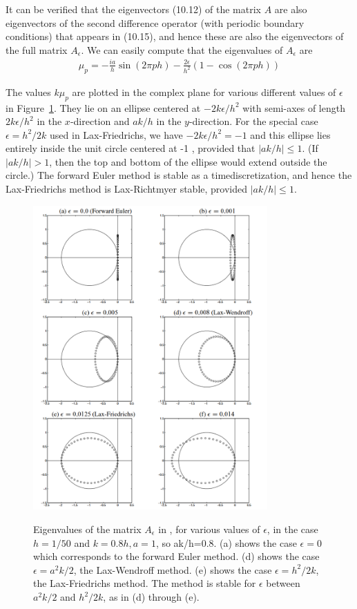 It can be verified that the eigenvectors (10.12) of the matrix $A$ are also eigenvectors of the second difference operator (with periodic boundary conditions) that appears in (10.15), and hence these are also the eigenvectors of the full matrix $A_\epsilon$. We can easily compute that the eigenvalues of $A_\epsilon$ are
\begin{align}
    \label{eq: eig of Aeps LF advect}
\mu_p=-\frac{i a}{h} \sin (2 \pi p h)-\frac{2 \epsilon}{h^2}(1-\cos (2 \pi p h))
\end{align}

The values $k \mu_p$ are plotted in the complex plane for various different values of $\epsilon$ in Figure~\ref{fig 10.1}. They lie on an ellipse centered at $-2 k \epsilon / h^2$ with semi-axes of length $2 k \epsilon / h^2$ in the $x$-direction and $a k / h$ in the $y$-direction. For the special case $\epsilon=h^2 / 2 k$ used in Lax-Friedrichs, we have $-2 k \epsilon / h^2=-1$ and this ellipse lies entirely inside the unit circle centered at -1 , provided that $|a k / h| \leq 1$. (If $|a k / h|>1$, then the top and bottom of the ellipse would extend outside the circle.) The forward Euler method is stable as a timediscretization, and hence the Lax-Friedrichs method is Lax-Richtmyer stable, provided $|a k / h| \leq 1$. 

\begin{figure}[H]
    \centering
    \includegraphics[width=0.8\textwidth]{figures/26-1.png}
    \label{fig 10.1}
    \caption{Eigenvalues of the matrix $A_\epsilon$ in , for various values of $\epsilon$, in the case $h=1 / 50$ and $k=0.8 h, a=1$, so ak/h=0.8. (a) shows the case $\epsilon=0$ which corresponds to the forward Euler method. (d) shows the case $\epsilon=a^2 k / 2$, the Lax-Wendroff method. (e) shows the case $\epsilon=h^2 / 2 k$, the Lax-Friedrichs method. The method is stable for $\epsilon$ between $a^2 k / 2$ and $h^2 / 2 k$, as in (d) through (e).}
\end{figure}
